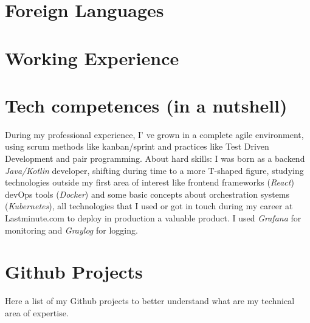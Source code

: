 \documentclass[letterpaper]{twentysecondcv} %
\begin{document}
\section{Foreign Languages}

\begin{twenty}
\end{twenty}


\section{Working Experience}

\begin{twenty}
\end{twenty}

\section{Tech competences (in a nutshell)}

During my professional experience, I' ve grown in a complete agile environment, using scrum methods like kanban/sprint and practices like Test Driven Development and pair programming. \newline 
About hard skills: I was born as a backend \emph{Java/Kotlin} developer, shifting during time to a more T-shaped figure, studying technologies outside my first area of interest like frontend frameworks (\emph{React}) devOps tools (\emph{Docker}) and some basic concepts about orchestration systems (\emph{Kubernetes}), all technologies that I used or got in touch during my career at Lastminute.com to deploy in production a valuable product.\newline
I used \emph{Grafana} for monitoring and \emph{Graylog} for logging.\newline

\section{Github Projects}
\newline\newline
Here a list of my Github projects to better understand what are my technical area of expertise.
\end{document}
